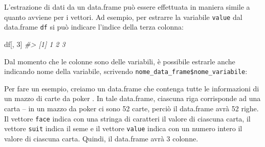 \documentclass[
  11pt,
]{krantz}
\makeatletter
\newenvironment{Shaded}{\begin{snugshade}}{\end{snugshade}}
\newcommand{\CommentTok}[1]{\textcolor[rgb]{0.37,0.37,0.37}{\textit{#1}}}
\newcommand{\DecValTok}[1]{\textcolor[rgb]{0.06,0.06,0.06}{#1}}
\newcommand{\NormalTok}[1]{#1}
\newcommand{\SpecialCharTok}[1]{\textcolor[rgb]{0,0,0}{#1}}
\newenvironment{kframe}{%
\medskip{}
\setlength{\fboxsep}{.8em}
 \def\at@end@of@kframe{}%
 \ifinner\ifhmode%
  \def\at@end@of@kframe{\end{minipage}}%
  \begin{minipage}{\columnwidth}%
 \fi\fi%
 \def\FrameCommand##1{\hskip\@totalleftmargin \hskip-\fboxsep
 \colorbox{shadecolor}{##1}\hskip-\fboxsep
     \hskip-\linewidth \hskip-\@totalleftmargin \hskip\columnwidth}%
 \MakeFramed {\advance\hsize-\width
   \@totalleftmargin\z@ \linewidth\hsize
   \@setminipage}}%
 {\par\unskip\endMakeFramed%
 \at@end@of@kframe}
\renewenvironment{Shaded}{\begin{kframe}}{\end{kframe}}
\theoremstyle{definition}
\theoremstyle{definition}
\theoremstyle{definition}
\theoremstyle{definition}
\theoremstyle{remark}
\makeatother
\begin{document}
L'estrazione di dati da un data.frame può essere effettuata in maniera simile a quanto avviene per i vettori. Ad esempio, per estrarre la variabile \texttt{value} dal data.frame \texttt{df} si può indicare l'indice della terza colonna:

\begin{Shaded}
\begin{Highlighting}[]
\NormalTok{df[, }\DecValTok{3}\NormalTok{]}
\CommentTok{\#\textgreater{} [1] 1 2 3}
\end{Highlighting}
\end{Shaded}

Dal momento che le colonne sono delle variabili, è possibile estrarle anche indicando nome della variabile, scrivendo \texttt{nome\_data\_frame\$nome\_variabile}:

\begin{Shaded}
\end{Shaded}

Per fare un esempio, creiamo un data.frame che contenga tutte le informazioni di un mazzo di carte da poker \citep{grolemund2014hands}. In tale data.frame, ciascuna riga corrisponde ad una carta -- in un mazzo da poker ci sono 52 carte, perciò il data.frame avrà 52 righe. Il vettore \texttt{face} indica con una stringa di caratteri il valore di ciascuna carta, il vettore \texttt{suit} indica il seme e il vettore \texttt{value} indica con un numero intero il valore di ciascuna carta. Quindi, il data.frame avrà 3 colonne.
\end{document}
